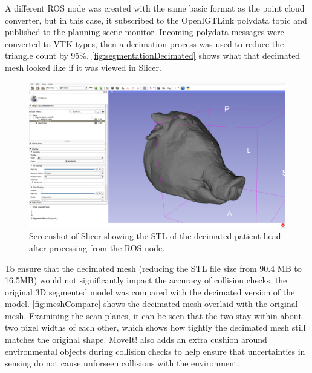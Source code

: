 \documentclass[12pt]{report}
\begin{document}
A different ROS node was created with the same basic format as the point cloud converter, but in this case, it subscribed to the OpenIGTLink polydata topic and published to the planning scene monitor. Incoming polydata messages were converted to VTK types, then a decimation process was used to reduce the triangle count by 95\%. \autoref{fig:segmentationDecimated} shows what that decimated mesh looked like if it was viewed in Slicer.

\begin{figure}[thpb]
	\centering
	\includegraphics[width=\textwidth]{images/segmentation_decimated.png}
    \caption{Screenshot of Slicer showing the STL of the decimated patient head after processing from the ROS node.}
    \label{fig:segmentationDecimated}
\end{figure}

To ensure that the decimated mesh (reducing the STL file size from 90.4 MB to 16.5MB) would not significantly impact the accuracy of collision checks, the original 3D segmented model was compared with the decimated version of the model. \autoref{fig:meshCompare} shows the decimated mesh overlaid with the original mesh. Examining the scan planes, it can be seen that the two stay within about two pixel widths of each other, which shows how tightly the decimated mesh still matches the original shape. MoveIt! also adds an extra cushion around environmental objects during collision checks to help ensure that uncertainties in sensing do not cause unforseen collisions with the environment.
\end{document}
